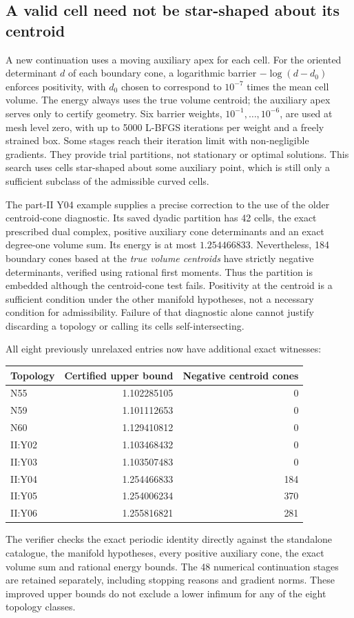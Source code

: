 \documentclass[11pt,a4paper]{report}
\begin{document}
\subsection{A valid cell need not be star-shaped about its centroid}

A new continuation uses a moving auxiliary apex for each cell. For the
oriented determinant $d$ of each boundary cone, a logarithmic barrier
$-\log(d-d_0)$ enforces positivity, with $d_0$ chosen to correspond to
$10^{-7}$ times the mean cell volume. The energy always uses the true
volume centroid; the auxiliary apex serves only to certify geometry.
Six barrier weights, $10^{-1},\ldots,10^{-6}$, are used at mesh level zero,
with up to 5000 L-BFGS iterations per weight and a freely strained box.
Some stages reach their iteration limit with non-negligible gradients.
They provide trial partitions, not stationary or optimal solutions.
This search uses cells star-shaped about some auxiliary point, which is
still only a sufficient subclass of the admissible curved cells.

The part-II Y04 example supplies a precise correction to the use of the
older centroid-cone diagnostic. Its saved dyadic partition has 42 cells,
the exact prescribed dual complex, positive auxiliary cone determinants
and an exact degree-one volume sum. Its energy is at most $1.254466833$.
Nevertheless, 184 boundary cones based at the \emph{true volume centroids}
have strictly negative determinants, verified using rational first moments.
Thus the partition is embedded although the centroid-cone test fails.
Positivity at the centroid is a sufficient condition under the other
manifold hypotheses, not a necessary condition for admissibility.
Failure of that diagnostic alone cannot justify discarding a topology or
calling its cells self-intersecting.

All eight previously unrelaxed entries now have additional exact witnesses:
\begin{center}
\begin{tabular}{lrr}
\toprule
Topology & Certified upper bound & Negative centroid cones\\
\midrule
N55 & 1.102285105 & 0\\
N59 & 1.101112653 & 0\\
N60 & 1.129410812 & 0\\
II:Y02 & 1.103468432 & 0\\
II:Y03 & 1.103507483 & 0\\
II:Y04 & 1.254466833 & 184\\
II:Y05 & 1.254006234 & 370\\
II:Y06 & 1.255816821 & 281\\
\bottomrule
\end{tabular}
\end{center}
The verifier checks the exact periodic identity directly against the
standalone catalogue, the manifold hypotheses, every positive auxiliary
cone, the exact volume sum and rational energy bounds. The 48 numerical
continuation stages are retained separately, including stopping reasons
and gradient norms. These improved upper bounds do not exclude a lower
infimum for any of the eight topology classes.
\end{document}

